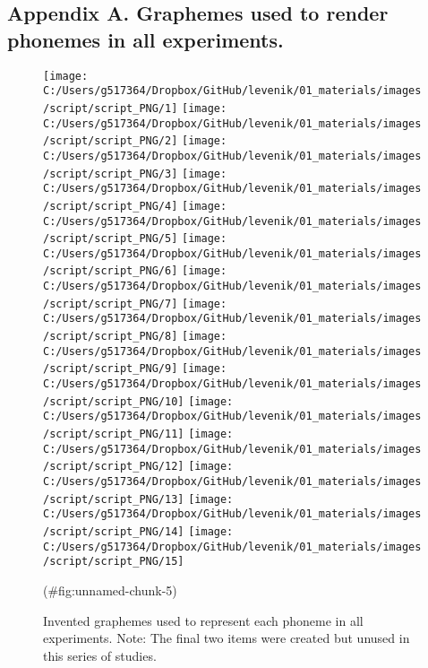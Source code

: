 \clearpage



\begin{appendix}
\section{}
\subsection{Appendix A. Graphemes used to render phonemes in all
experiments.}\label{appendix-a}

\begin{figure}[htb]

{\centering \texttt{[image: C:/Users/g517364/Dropbox/GitHub/levenik/01\_materials/images/script/script\_PNG/1]} \texttt{[image: C:/Users/g517364/Dropbox/GitHub/levenik/01\_materials/images/script/script\_PNG/2]} \texttt{[image: C:/Users/g517364/Dropbox/GitHub/levenik/01\_materials/images/script/script\_PNG/3]} \texttt{[image: C:/Users/g517364/Dropbox/GitHub/levenik/01\_materials/images/script/script\_PNG/4]} \texttt{[image: C:/Users/g517364/Dropbox/GitHub/levenik/01\_materials/images/script/script\_PNG/5]} \texttt{[image: C:/Users/g517364/Dropbox/GitHub/levenik/01\_materials/images/script/script\_PNG/6]} \texttt{[image: C:/Users/g517364/Dropbox/GitHub/levenik/01\_materials/images/script/script\_PNG/7]} \texttt{[image: C:/Users/g517364/Dropbox/GitHub/levenik/01\_materials/images/script/script\_PNG/8]} \texttt{[image: C:/Users/g517364/Dropbox/GitHub/levenik/01\_materials/images/script/script\_PNG/9]} \texttt{[image: C:/Users/g517364/Dropbox/GitHub/levenik/01\_materials/images/script/script\_PNG/10]} \texttt{[image: C:/Users/g517364/Dropbox/GitHub/levenik/01\_materials/images/script/script\_PNG/11]} \texttt{[image: C:/Users/g517364/Dropbox/GitHub/levenik/01\_materials/images/script/script\_PNG/12]} \texttt{[image: C:/Users/g517364/Dropbox/GitHub/levenik/01\_materials/images/script/script\_PNG/13]} \texttt{[image: C:/Users/g517364/Dropbox/GitHub/levenik/01\_materials/images/script/script\_PNG/14]} \texttt{[image: C:/Users/g517364/Dropbox/GitHub/levenik/01\_materials/images/script/script\_PNG/15]} 

}

\caption{Invented graphemes used to represent each phoneme in all experiments. Note: The final two items were created but unused in this series of studies.}(\#fig:unnamed-chunk-5)
\end{figure}
\end{appendix}

